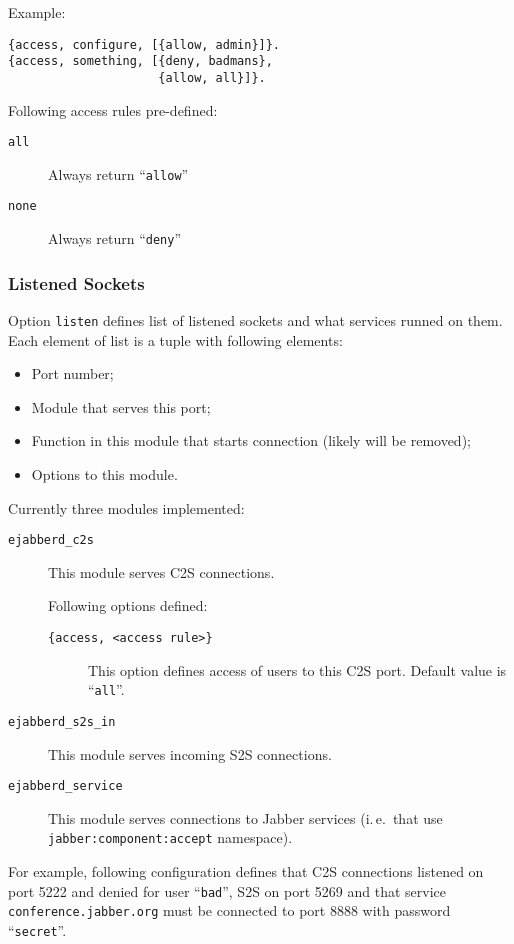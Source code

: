 \documentclass[10pt]{article}
\newcommand{\Jabber}{Jabber}
\begin{document}
Example:
\begin{verbatim}
{access, configure, [{allow, admin}]}.
{access, something, [{deny, badmans},
                     {allow, all}]}.
\end{verbatim}

Following access rules pre-defined:
\begin{description}
\item[\texttt{all}] Always return ``\texttt{allow}''
\item[\texttt{none}] Always return ``\texttt{deny}''
\end{description}


\subsubsection{Listened Sockets}
\label{sec:configlistened}

Option \texttt{listen} defines list of listened sockets and what services
runned on them.  Each element of list is a tuple with following elements:
\begin{itemize}
\item Port number;
\item Module that serves this port;
\item Function in this module that starts connection (likely will be removed);
\item Options to this module.
\end{itemize}

Currently three modules implemented:
\begin{description}
\item[\texttt{ejabberd\_c2s}] This module serves C2S connections.
  
  Following options defined:
  \begin{description}
  \item[\texttt{\{access, <access rule>\}}] This option defines access of users
    to this C2S port.  Default value is ``\texttt{all}''.
  \end{description}
\item[\texttt{ejabberd\_s2s\_in}] This module serves incoming S2S connections.
\item[\texttt{ejabberd\_service}] This module serves connections to \Jabber{}
  services (i.\,e.\ that use \texttt{jabber:component:accept} namespace).
\end{description}

For example, following configuration defines that C2S connections listened on
port 5222 and denied for user ``\texttt{bad}'', S2S on port 5269 and that
service \texttt{conference.jabber.org} must be connected to port 8888 with
password ``\texttt{secret}''.
\end{document}

